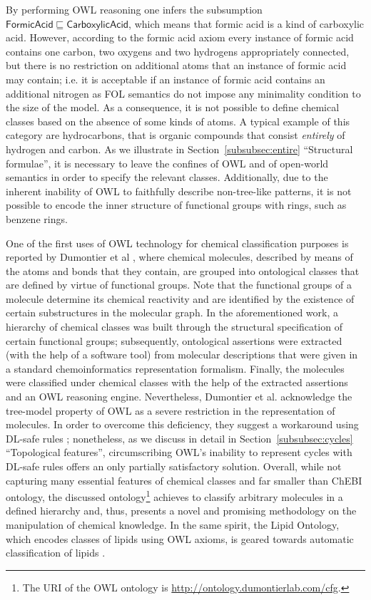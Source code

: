 \documentclass[10pt]{bmc_article}
\newenvironment{bmcformat}{\baselineskip20pt\sloppy\setboolean{publ}{false}}{\baselineskip20pt\sloppy}
\begin{document}
\begin{bmcformat}
\noindent By performing OWL reasoning one infers the subsumption $\mathsf{FormicAcid \sqsubseteq CarboxylicAcid}$, which means that formic acid is a kind of carboxylic acid. However, according to the formic acid axiom every instance of formic acid contains one carbon, two oxygens and two hydrogens appropriately connected, but there is no restriction on additional atoms that an instance of formic acid may contain; i.e. it is acceptable if an instance of formic acid contains an additional nitrogen as FOL semantics do not impose any minimality condition to the size of the model. As a consequence, it is not possible to define chemical classes based on the absence of some kinds of atoms.  A typical example of this category are hydrocarbons, that is organic compounds that consist \emph{entirely} of hydrogen and carbon. As we illustrate in Section~\ref{subsubsec:entire} ``Structural formulae'', it is necessary to leave the confines of OWL and of open-world semantics in order to specify the relevant classes.
Additionally, due to the inherent inability of OWL to faithfully describe non-tree-like patterns, it is not possible to encode  the inner structure of functional groups with rings, such as benzene rings. 


 One of the first uses of OWL technology for chemical classification purposes is reported by Dumontier et al \cite{dumontier2007}, where chemical molecules, described by means of the atoms and bonds that they contain, are grouped into ontological classes that are defined by virtue of functional groups. Note that the functional groups of a molecule determine its chemical reactivity and are identified by the existence of certain substructures in the molecular graph. In the aforementioned work, a hierarchy of chemical classes was built through the structural specification of certain functional groups; subsequently, ontological assertions were extracted (with the help of a software tool) from molecular descriptions that were given in a standard chemoinformatics representation formalism. Finally, the molecules were classified under chemical classes with the help of the extracted assertions and an OWL reasoning engine. Nevertheless, Dumontier et al. \cite{dumontier2007} acknowledge the tree-model property of OWL as a severe restriction in the representation of molecules. In order to overcome this deficiency,  they suggest a workaround using DL-safe rules \cite{dumontier2007}; nonetheless, as we discuss in detail in Section~\ref{subsubsec:cycles} ``Topological features'', circumscribing OWL's inability to represent cycles with DL-safe rules offers an only partially satisfactory solution.
Overall, while not capturing many essential features of chemical classes and far smaller than ChEBI ontology, the discussed ontology\footnote{The URI of the OWL ontology \cite{dumontier2007} is \url{http://ontology.dumontierlab.com/cfg}.} achieves to classify arbitrary molecules in a defined hierarchy and, thus, presents a novel and promising methodology on the manipulation of chemical knowledge. In the same spirit, the Lipid Ontology, which encodes classes of lipids using OWL axioms, is geared towards automatic classification of lipids \cite{chepelevlipids2011}.
 



\end{bmcformat}
\end{document}

